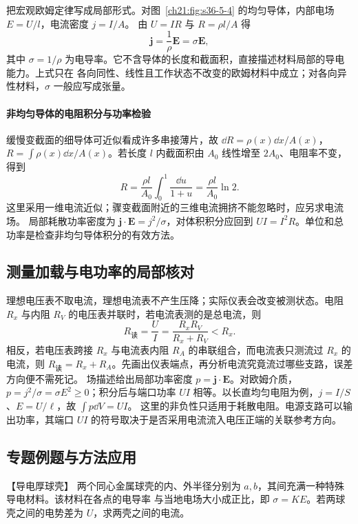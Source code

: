 {把宏观欧姆定律写成局部形式。对图~\ref{ch21:fig:s36-5-4} 的均匀导体，内部电场 $E=U/l$，电流密度 $j=I/A$。
由 $U=IR$ 与 $R=\rho l/A$ 得
\begin{equation}
  \boxed{\boldsymbol j=\frac1\rho\boldsymbol E=\sigma\boldsymbol E},
\end{equation}
其中 $\sigma=1/\rho$ 为电导率。它不含导体的长度和截面积，直接描述材料局部的导电能力。上式只在
各向同性、线性且工作状态不改变的欧姆材料中成立；对各向异性材料，$\sigma$ 一般应写成张量。


\paragraph{非均匀导体的电阻积分与功率检验}
缓慢变截面的细导体可近似看成许多串接薄片，故
$\dd R=\rho(x)\dd x/A(x)$，$R=\int\rho(x)\dd x/A(x)$。若长度 $l$ 内截面积由 $A_0$ 线性增至 $2A_0$、电阻率不变，得到
\[
 R=\frac{\rho l}{A_0}\int_0^1\frac{\dd u}{1+u}
 =\frac{\rho l}{A_0}\ln2.
\]
这里采用一维电流近似；骤变截面附近的三维电流拥挤不能忽略时，应另求电流场。
局部耗散功率密度为 $\boldsymbol j\cdot\boldsymbol E=j^2/\sigma$，对体积积分应回到 $UI=I^2R$。单位和总功率是检查非均匀导体积分的有效方法。


\subsection{测量加载与电功率的局部核对}
理想电压表不取电流，理想电流表不产生压降；实际仪表会改变被测状态。电阻 $R_x$ 与内阻 $R_V$ 的电压表并联时，若电流表测的是总电流，则
\[
 R_{\text{读}}=\frac UI=\frac{R_xR_V}{R_x+R_V}<R_x.
\]
相反，若电压表跨接 $R_x$ 与电流表内阻 $R_A$ 的串联组合，而电流表只测流过 $R_x$ 的电流，则 $R_{\text{读}}=R_x+R_A$。先画出仪表端点，再分析电流究竟流过哪些支路，误差方向便不需死记。
场描述给出局部功率密度 $p=\boldsymbol j\cdot\boldsymbol E$。对欧姆介质，$p=j^2/\sigma=\sigma E^2\ge0$；积分后与端口功率 $UI$ 相等。以长直均匀电阻为例，$j=I/S$、$E=U/\ell$，故 $\int p\dd V=UI$。
这里的非负性只适用于耗散电阻。电源支路可以输出功率，其端口 $UI$ 的符号取决于是否采用电流流入电压正端的关联参考方向。


\subsection{专题例题与方法应用}

\begin{origexamplebox}{【导电厚球壳】}\label{ch21:ex:s36-5-5}
两个同心金属球壳的内、外半径分别为 $a,b$，其间充满一种特殊导电材料。该材料在各点的电导率
与当地电场大小成正比，即 $\sigma=KE$。若两球壳之间的电势差为 $U$，求两壳之间的电流。
\par\noindent\begin{minipage}{\linewidth}
\emConductingShellQuestion
{}
\end{minipage}\par\medskip
\end{origexamplebox}
\begin{xesolution}\par\nopagebreak[4]


\end{xesolution}}
